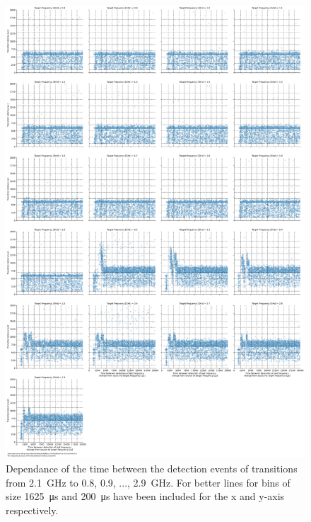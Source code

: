 \begin{figure}[]
    \centering
    \includegraphics[width=\columnwidth]{fig/ftalat/ftalat_scatter_wait_transition_latency_hati_source_2.1.pdf}
    \caption{Dependance of the time between the detection events of transitions from \SI{2.1}{\GHz} to \SI{0.8}{}, \SI{0.9}{}, ..., \SI{2.9}{\GHz}. For better lines for bins of size \SI{1625}{\us} and \SI{200}{\us} have been included for the x and y-axis respectively.}
\end{figure}
